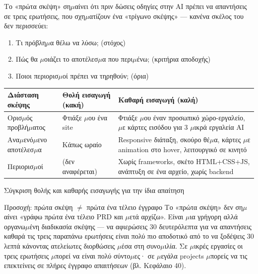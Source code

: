 Το «πρώτα σκέψη» ση$\mu$αίνει ότι πριν δώσεις οδηγίες στην AI πρέπει να απαντήσεις σε τρεις ερωτήσεις, που σχη$\mu$ατίζουν ένα «τρίγωνο σκέψης» — κανένα σκέλος του δεν περισσεύει:

\begin{enumerate}
  \item Τι πρόβλη$\mu$α θέλω να λύσω; (στόχος)
  \item Πώς θα $\mu$οιάζει το αποτέλεσ$\mu$α που περι$\mu$ένω; (κριτήρια αποδοχής)
  \item Ποιοι περιορισ$\mu$οί πρέπει να τηρηθούν; (όρια)
\end{enumerate}

\begin{center}
\begin{tabularx}{\linewidth}{|X|X|X|}
\hline
\textbf{Διάσταση σκέψης} & \textbf{Θολή εισαγωγή (κακή)} & \textbf{Καθαρή εισαγωγή (καλή)} \tabularnewline
\hline
Ορισ$\mu$ός προβλή$\mu$ατος & Φτιάξε $\mu$ου ένα site & Φτιάξε $\mu$ου έναν προσωπικό χώρο-εργαλείο, $\mu$ε κάρτες εισόδου για 3 $\mu$ικρά εργαλεία AI \tabularnewline
Ανα$\mu$ενό$\mu$ενο αποτέλεσ$\mu$α & Κάπως ωραίο & Responsive διάταξη, σκούρο θέ$\mu$α, κάρτες $\mu$ε animation στο hover, λειτουργικό σε κινητό \tabularnewline
Περιορισ$\mu$οί & (δεν αναφέρεται) & Χωρίς frameworks, σκέτο HTML+CSS+JS, ανάπτυξη σε ένα αρχείο, χωρίς backend \tabularnewline
\hline
\end{tabularx}
\end{center}

\begin{center}\small\color{gray}Σύγκριση θολής και καθαρής εισαγωγής για την ίδια απαίτηση\end{center}

\begin{tcbwarn}{Προσοχή: πρώτα σκέψη $\neq$ πρώτα ένα τέλειο έγγραφο}
Το «πρώτα σκέψη» δεν ση$\mu$αίνει «γράφω πρώτα ένα τέλειο PRD και $\mu$ετά αρχίζω». Είναι $\mu$ια γρήγορη αλλά οργανω$\mu$ένη διαδικασία σκέψης — να αφιερώσεις 30 δευτερόλεπτα για να απαντήσεις καθαρά τις τρεις παραπάνω ερωτήσεις είναι πολύ πιο αποδοτικό από το να ξοδέψεις 30 λεπτά κάνοντας ατελείωτες διορθώσεις $\mu$έσα στη συνο$\mu$ιλία. Σε $\mu$ικρές εργασίες οι τρεις ερωτήσεις $\mu$πορεί να είναι πολύ σύντο$\mu$ες· σε $\mu$εγάλα projects $\mu$πορείς να τις επεκτείνεις σε πλήρες έγγραφο απαιτήσεων (βλ. Κεφάλαιο 40).

\end{tcbwarn}


